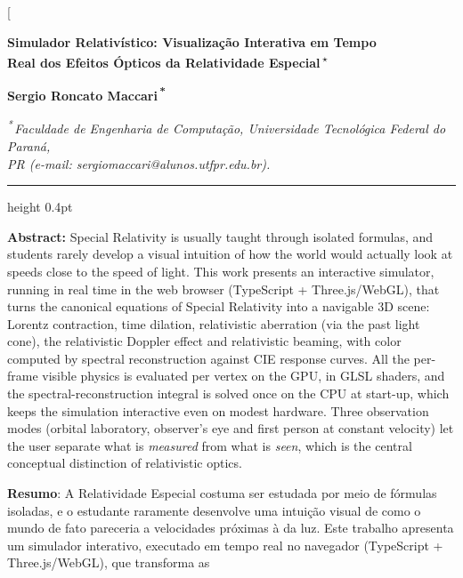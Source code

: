 \documentclass[10pt,a4paper,twocolumn]{article}
\begin{document}
\twocolumn[{
  \begin{center}
    {\large\bfseries Simulador Relativístico: Visualização Interativa em Tempo\\[0.25em]
     Real dos Efeitos Ópticos da Relatividade Especial\,\textsuperscript{$\star$}\par}
    \vspace{1.5em}
    {\bfseries Sergio Roncato Maccari\,\textsuperscript{*}}\par
    \vspace{1.1em}
    {\small\itshape \textsuperscript{*}\,Faculdade de Engenharia de Computação, Universidade
     Tecnológica Federal do Paraná,\\ PR (e-mail: sergiomaccari@alunos.utfpr.edu.br).}\par
  \end{center}
  \vspace{0.9em}
  \hrule height 0.4pt
  \vspace{1.0em}
  {\small
  \noindent\textbf{Abstract:} Special Relativity is usually taught through isolated formulas,
  and students rarely develop a visual intuition of how the world would actually look at
  speeds close to the speed of light. This work presents an interactive simulator, running
  in real time in the web browser (TypeScript + Three.js/WebGL), that turns the canonical
  equations of Special Relativity into a navigable 3D scene: Lorentz contraction, time
  dilation, relativistic aberration (via the past light cone), the relativistic Doppler
  effect and relativistic beaming, with color computed by spectral reconstruction against
  CIE response curves. All the per-frame visible physics is evaluated per vertex on the GPU,
  in GLSL shaders, and the spectral-reconstruction integral is solved once on the CPU at
  start-up, which keeps the simulation interactive even on modest hardware. Three observation modes
  (orbital laboratory, observer's eye and first person at constant velocity) let the user
  separate what is \emph{measured} from what is \emph{seen}, which is the central conceptual
  distinction of relativistic optics.\par
  \vspace{0.6em}
  \noindent\textbf{Resumo}: A Relatividade Especial costuma ser estudada por meio de fórmulas
  isoladas, e o estudante raramente desenvolve uma intuição visual de como o mundo de fato
  pareceria a velocidades próximas à da luz. Este trabalho apresenta um simulador interativo,
  executado em tempo real no navegador (TypeScript + Three.js/WebGL), que transforma as
}}
\end{document}
